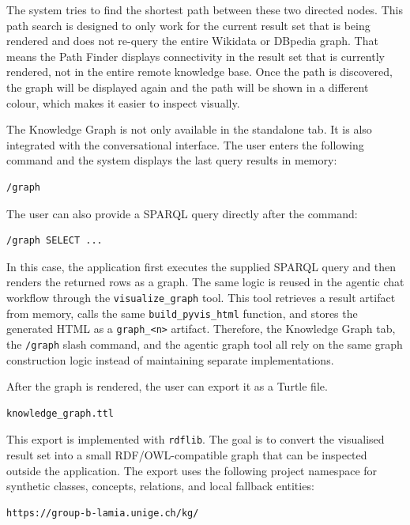 \documentclass[11pt,a4paper]{article}
\begin{document}
The system tries to find the shortest path between these two directed nodes. This path search is designed to only work for the current result set that is being rendered and does not re-query the entire Wikidata or DBpedia graph. That means the Path Finder displays connectivity in the result set that is currently rendered, not in the entire remote knowledge base. Once the path is discovered, the graph will be displayed again and the path will be shown in a different colour, which makes it easier to inspect visually.

The Knowledge Graph is not only available in the standalone tab. It is also integrated with the conversational interface. The user enters the following command and the system displays the last query results in memory:

\begin{lstlisting}[style=plainStyle]
/graph
\end{lstlisting}

The user can also provide a SPARQL query directly after the command:

\begin{lstlisting}[style=plainStyle]
/graph SELECT ...
\end{lstlisting}

In this case, the application first executes the supplied SPARQL query and then renders the returned rows as a graph. The same logic is reused in the agentic chat workflow through the \texttt{visualize\_graph} tool. This tool retrieves a result artifact from memory, calls the same \texttt{build\_pyvis\_html} function, and stores the generated HTML as a \texttt{graph\_<n>} artifact. Therefore, the Knowledge Graph tab, the \texttt{/graph} slash command, and the agentic graph tool all rely on the same graph construction logic instead of maintaining separate implementations.

After the graph is rendered, the user can export it as a Turtle file.

\begin{lstlisting}[style=plainStyle]
knowledge_graph.ttl
\end{lstlisting}

This export is implemented with \texttt{rdflib}. The goal is to convert the visualised result set into a small RDF/OWL-compatible graph that can be inspected outside the application. The export uses the following project namespace for synthetic classes, concepts, relations, and local fallback entities:

\begin{lstlisting}[style=plainStyle]
https://group-b-lamia.unige.ch/kg/
\end{lstlisting}
\end{document}
